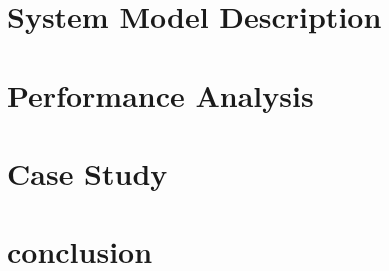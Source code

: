 \documentclass{IEEEtran}
\begin{document}
\section{System Model Description}



\section{Performance Analysis}


\section{Case Study}



\section{conclusion}






\end{document}
